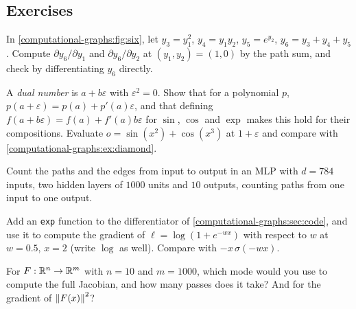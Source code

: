 \begin{notechapter}
\section*{Exercises}

\begin{exercise}\label{computational-graphs:exr:1}
In \cref{computational-graphs:fig:six}, let $y_3 = y_1^2$, $y_4 = y_1y_2$, $y_5 = e^{y_2}$, $y_6 = y_3 + y_4 + y_5$. Compute $\partial y_6/\partial y_1$ and
$\partial y_6/\partial y_2$ at $(y_1,y_2) = (1,0)$ by the path sum, and check by differentiating $y_6$ directly.
\end{exercise}

\begin{exercise}\label{computational-graphs:exr:2}
A \emph{dual number} is $a + b\varepsilon$ with $\varepsilon^2 = 0$. Show that for a polynomial $p$, $p(a + \varepsilon) = p(a) + p'(a)\varepsilon$, and
that defining $f(a + b\varepsilon) = f(a) + f'(a)b\varepsilon$ for $\sin$, $\cos$ and $\exp$ makes this hold for their compositions.
Evaluate $o = \sin(x^2) + \cos(x^3)$ at $1 + \varepsilon$ and compare with \cref{computational-graphs:ex:diamond}.
\end{exercise}

\begin{exercise}\label{computational-graphs:exr:3}
Count the paths and the edges from input to output in an MLP with $d = 784$ inputs, two hidden
layers of $1000$ units and $10$ outputs, counting paths from one input to one output.
\end{exercise}

\begin{exercise}\label{computational-graphs:exr:4}
Add an \texttt{exp} function to the differentiator of \cref{computational-graphs:sec:code}, and use
it to compute the gradient of $\ell = \log(1 + e^{-w x})$ with respect to $w$ at $w = 0.5$, $x = 2$ (write $\log$
as well). Compare with $-x\,\sigma(-wx)$.
\end{exercise}

\begin{exercise}\label{computational-graphs:exr:5}
For $F:\mathbb{R}^n\to\mathbb{R}^m$ with $n = 10$ and $m = 1000$, which mode would you use to compute the full Jacobian, and
how many passes does it take? And for the gradient of $\left\|F(x)\right\|^2$?
\end{exercise}
\end{notechapter}
